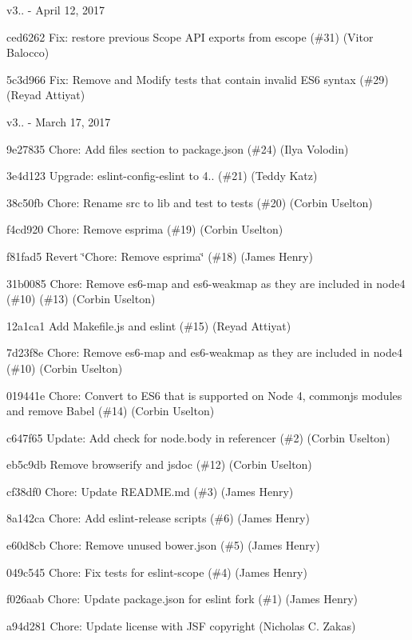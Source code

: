 v3.. -\/ April 12, 2017


\begin{DoxyItemize}
\item ced6262 Fix\+: restore previous Scope API exports from escope (\#31) (Vitor Balocco)
\item 5c3d966 Fix\+: Remove and Modify tests that contain invalid ES6 syntax (\#29) (Reyad Attiyat)
\end{DoxyItemize}

v3.. -\/ March 17, 2017


\begin{DoxyItemize}
\item 9e27835 Chore\+: Add files section to package.\+json (\#24) (Ilya Volodin)
\item 3e4d123 Upgrade\+: eslint-\/config-\/eslint to 4.. (\#21) (Teddy Katz)
\item 38c50fb Chore\+: Rename src to lib and test to tests (\#20) (Corbin Uselton)
\item f4cd920 Chore\+: Remove esprima (\#19) (Corbin Uselton)
\item f81fad5 Revert \char`\"{}\+Chore\+: Remove esprima\char`\"{} (\#18) (James Henry)
\item 31b0085 Chore\+: Remove es6-\/map and es6-\/weakmap as they are included in node4 (\#10) (\#13) (Corbin Uselton)
\item 12a1ca1 Add Makefile.\+js and eslint (\#15) (Reyad Attiyat)
\item 7d23f8e Chore\+: Remove es6-\/map and es6-\/weakmap as they are included in node4 (\#10) (Corbin Uselton)
\item 019441e Chore\+: Convert to ES6 that is supported on Node 4, commonjs modules and remove Babel (\#14) (Corbin Uselton)
\item c647f65 Update\+: Add check for node.\+body in referencer (\#2) (Corbin Uselton)
\item eb5c9db Remove browserify and jsdoc (\#12) (Corbin Uselton)
\item cf38df0 Chore\+: Update README.\+md (\#3) (James Henry)
\item 8a142ca Chore\+: Add eslint-\/release scripts (\#6) (James Henry)
\item e60d8cb Chore\+: Remove unused bower.\+json (\#5) (James Henry)
\item 049c545 Chore\+: Fix tests for eslint-\/scope (\#4) (James Henry)
\item f026aab Chore\+: Update package.\+json for eslint fork (\#1) (James Henry)
\item a94d281 Chore\+: Update license with JSF copyright (Nicholas C. Zakas) 
\end{DoxyItemize}